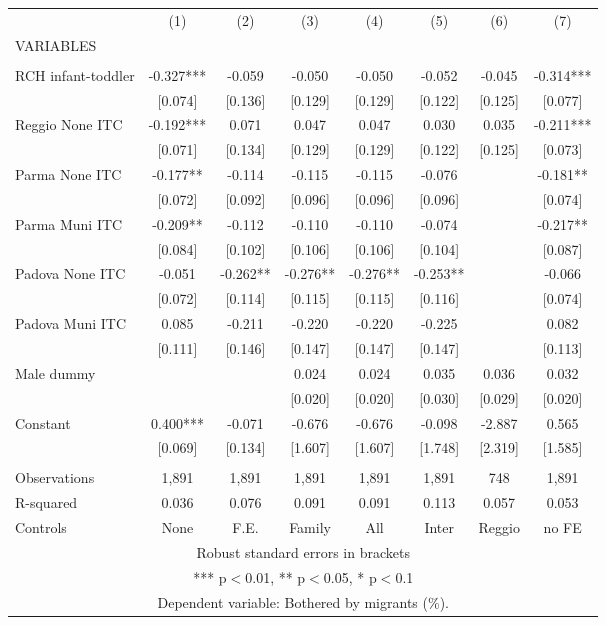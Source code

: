 \begin{tabular}{lccccccc} \hline
 & (1) & (2) & (3) & (4) & (5) & (6) & (7) \\
VARIABLES &  &  &  &  &  &  &  \\ \hline
 &  &  &  &  &  &  &  \\
RCH infant-toddler & -0.327*** & -0.059 & -0.050 & -0.050 & -0.052 & -0.045 & -0.314*** \\
 & [0.074] & [0.136] & [0.129] & [0.129] & [0.122] & [0.125] & [0.077] \\
Reggio None ITC & -0.192*** & 0.071 & 0.047 & 0.047 & 0.030 & 0.035 & -0.211*** \\
 & [0.071] & [0.134] & [0.129] & [0.129] & [0.122] & [0.125] & [0.073] \\
Parma None ITC & -0.177** & -0.114 & -0.115 & -0.115 & -0.076 &  & -0.181** \\
 & [0.072] & [0.092] & [0.096] & [0.096] & [0.096] &  & [0.074] \\
Parma Muni ITC & -0.209** & -0.112 & -0.110 & -0.110 & -0.074 &  & -0.217** \\
 & [0.084] & [0.102] & [0.106] & [0.106] & [0.104] &  & [0.087] \\
Padova None ITC & -0.051 & -0.262** & -0.276** & -0.276** & -0.253** &  & -0.066 \\
 & [0.072] & [0.114] & [0.115] & [0.115] & [0.116] &  & [0.074] \\
Padova Muni ITC & 0.085 & -0.211 & -0.220 & -0.220 & -0.225 &  & 0.082 \\
 & [0.111] & [0.146] & [0.147] & [0.147] & [0.147] &  & [0.113] \\
Male dummy &  &  & 0.024 & 0.024 & 0.035 & 0.036 & 0.032 \\
 &  &  & [0.020] & [0.020] & [0.030] & [0.029] & [0.020] \\
Constant & 0.400*** & -0.071 & -0.676 & -0.676 & -0.098 & -2.887 & 0.565 \\
 & [0.069] & [0.134] & [1.607] & [1.607] & [1.748] & [2.319] & [1.585] \\
 &  &  &  &  &  &  &  \\
Observations & 1,891 & 1,891 & 1,891 & 1,891 & 1,891 & 748 & 1,891 \\
R-squared & 0.036 & 0.076 & 0.091 & 0.091 & 0.113 & 0.057 & 0.053 \\
 Controls & None & F.E. & Family & All & Inter & Reggio & no FE \\ \hline
\multicolumn{8}{c}{ Robust standard errors in brackets} \\
\multicolumn{8}{c}{ *** p$<$0.01, ** p$<$0.05, * p$<$0.1} \\
\multicolumn{8}{c}{ Dependent variable: Bothered by migrants (\%).} \\
\end{tabular}
